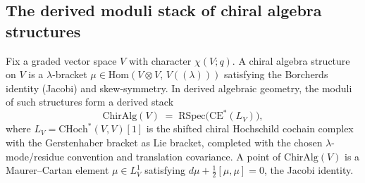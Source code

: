 \subsection{The derived moduli stack of chiral algebra structures}
\label{subsec:derived-stack-chiral}

Fix a graded vector space $V$ with character $\chi(V; q)$. A chiral
algebra structure on $V$ is a $\lambda$-bracket
$\mu \in \mathrm{Hom}(V \otimes V,\, V((\lambda)))$ satisfying the
Borcherds identity (Jacobi) and skew-symmetry. In derived algebraic
geometry, the moduli of such structures form a derived stack
\[
 \mathrm{ChirAlg}(V) \;=\;
 \mathrm{RSpec}\bigl(\mathrm{CE}^*(L_V)\bigr),
\]
where $L_V = \mathrm{CHoch}^*(V, V)[1]$ is the shifted chiral Hochschild
cochain complex with the Gerstenhaber bracket as Lie bracket, completed
with the chosen $\lambda$-mode/residue convention and translation
covariance. A point
of $\mathrm{ChirAlg}(V)$ is a Maurer--Cartan element $\mu \in L_V^1$
satisfying $d\mu + \tfrac{1}{2}[\mu, \mu] = 0$, the Jacobi identity.

